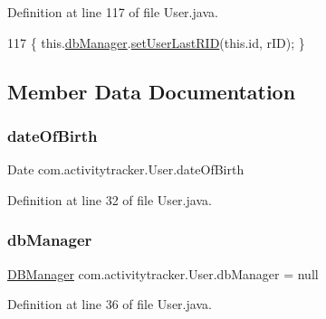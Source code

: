 Definition at line 117 of file User.\+java.


\begin{DoxyCode}
117 \{ this.\mbox{\hyperlink{classcom_1_1activitytracker_1_1_user_a8c8b36433447a235f2b4940b92e839c1}{dbManager}}.\mbox{\hyperlink{classcom_1_1activitytracker_1_1_d_b_manager_a93b7fc4c2d0083e125852d84f087a8d3}{setUserLastRID}}(this.\textcolor{keywordtype}{id}, rID); \}
\end{DoxyCode}


\subsection{Member Data Documentation}
\mbox{\label{classcom_1_1activitytracker_1_1_user_a40b0d4ce16246066c0e948edef864d94}} 
\subsubsection{\texorpdfstring{date\+Of\+Birth}{dateOfBirth}}
{\footnotesize\ttfamily Date com.\+activitytracker.\+User.\+date\+Of\+Birth\hspace{0.3cm}{\ttfamily [private]}}



Definition at line 32 of file User.\+java.

\mbox{\label{classcom_1_1activitytracker_1_1_user_a8c8b36433447a235f2b4940b92e839c1}} 
\subsubsection{\texorpdfstring{db\+Manager}{dbManager}}
{\footnotesize\ttfamily \mbox{\hyperlink{classcom_1_1activitytracker_1_1_d_b_manager}{D\+B\+Manager}} com.\+activitytracker.\+User.\+db\+Manager = null\hspace{0.3cm}{\ttfamily [private]}}



Definition at line 36 of file User.\+java.

